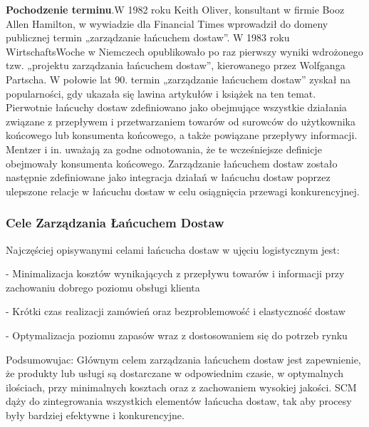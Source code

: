 \vspace{\baselineskip}
\textbf{Pochodzenie terminu}.W 1982 roku Keith Oliver, konsultant w firmie Booz Allen Hamilton, w wywiadzie dla Financial Times wprowadził do domeny publicznej termin „zarządzanie łańcuchem dostaw”. W 1983 roku WirtschaftsWoche w Niemczech opublikowało po raz pierwszy wyniki wdrożonego tzw. „projektu zarządzania łańcuchem dostaw”, kierowanego przez Wolfganga Partscha.
W połowie lat 90. termin „zarządzanie łańcuchem dostaw” zyskał na popularności, gdy ukazała się lawina artykułów i książek na ten temat. Pierwotnie łańcuchy dostaw zdefiniowano jako obejmujące wszystkie działania związane z przepływem i przetwarzaniem towarów od surowców do użytkownika końcowego lub konsumenta końcowego, a także powiązane przepływy informacji. Mentzer i in. uważają za godne odnotowania, że te wcześniejsze definicje obejmowały konsumenta końcowego. Zarządzanie łańcuchem dostaw zostało następnie zdefiniowane jako integracja działań w łańcuchu dostaw poprzez ulepszone relacje w łańcuchu dostaw w celu osiągnięcia przewagi konkurencyjnej. \cite{wiken2023}


\vspace{\baselineskip}
\subsubsection{Cele Zarządzania Łańcuchem Dostaw}



Najczęściej opisywanymi celami łańcucha dostaw w ujęciu logistycznym jest:

  \par - Minimalizacja kosztów wynikających z przepływu towarów i informacji przy zachowaniu dobrego poziomu obsługi klienta
  \par - Krótki czas realizacji zamówień oraz bezproblemowość i elastyczność dostaw
   \par- Optymalizacja poziomu zapasów wraz z dostosowaniem się do potrzeb rynku \cite{zarz2023}


Podsumowujac: Głównym celem zarządzania łańcuchem dostaw jest zapewnienie, że produkty lub usługi są dostarczane w odpowiednim czasie, w optymalnych ilościach, przy minimalnych kosztach oraz z zachowaniem wysokiej jakości. SCM dąży do zintegrowania wszystkich elementów łańcucha dostaw, tak aby procesy były bardziej efektywne i konkurencyjne.

